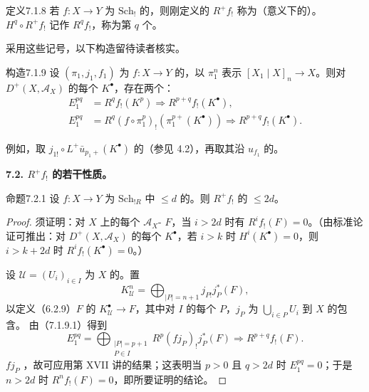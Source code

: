 \begin{SGAresult}{定义}{7.1.8}
若 $f:X\to Y$ 为 $\mathrm{Sch}_!$ 的，则刚定义的 $R^+f_!$ 称为（意义下的）。 $H^q\circ R^+f_!$ 记作 $R^qf_!$，称为第 $q$ 个。
\end{SGAresult}
采用这些记号，以下构造留待读者核实。

\begin{SGAresult}{构造}{7.1.9}
设 $(\pi_1,j_1,f_1)$ 为 $f:X\to Y$ 的，以 $\pi_1^n$ 表示 $[X_1\mid X]_n\to X$。则对 $D^+(X,\mathscr A_X)$ 的每个 $K^\bullet$，存在两个：
\begin{align}
E_1^{pq}&=R^qf_!(K^p)\Longrightarrow R^{p+q}f_!(K^\bullet),\tag{7.1.9.1}\\
E_1^{pq}&=R^q(f\circ\pi_1^p)_!(\pi_1^{p+}(K^\bullet))\Longrightarrow R^{p+q}f_!(K^\bullet).\tag{7.1.9.2}
\end{align}
\end{SGAresult}
例如，取 $j_{1!}\circ L^+\bar u_{p_1+}(K^\bullet)$ 的（参见 4.2），再取其沿 $u_{f_1}$ 的。

\textbf{7.2. $R^+f_!$ 的若干性质。}
\begin{SGAresult}{命题}{7.2.1}
设 $f:X\to Y$ 为 $\mathrm{Sch}_{!R}$ 中 $\le d$ 的。则 $R^+f_!$ 的 $\le2d$。
\end{SGAresult}
\begin{proof}
须证明：对 $X$ 上的每个 $\mathscr A_X$- $F$，当 $i>2d$ 时有 $R^if_!(F)=0$。（由标准论证可推出：对 $D^+(X,\mathscr A_X)$ 的每个 $K^\bullet$，若 $i>k$ 时 $H^i(K^\bullet)=0$，则 $i>k+2d$ 时 $R^if_!(K^\bullet)=0$。）

设 $\mathscr U=(U_i)_{i\in I}$ 为 $X$ 的。置
\[K_{\mathscr U}^n=\bigoplus_{|P|=n+1}j_{P!}j_P^*(F),\]
以定义（6.2.9）$F$ 的 $K_{\mathscr U}^\bullet\to F$，其中对 $I$ 的每个 $P$，$j_P$ 为 $\bigcup_{i\in P}U_i$ 到 $X$ 的包含。
由（7.1.9.1）得到
\[E_1^{pq}=\bigoplus_{\substack{|P|=p+1\\P\in I}}R^p(fj_P)_!j_P^*(F)\Longrightarrow R^{p+q}f_!(F).\]
$f j_P$ ，故可应用第 XVII 讲的结果；这表明当 $p>0$ 且 $q>2d$ 时 $E_1^{pq}=0$；于是 $n>2d$ 时 $R^nf_!(F)=0$，即所要证明的结论。
\end{proof}

